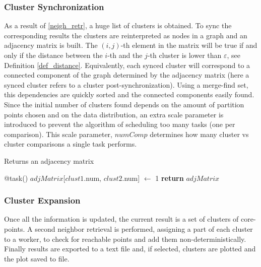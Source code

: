 \documentclass[10pt,journal,compsoc]{IEEEtran}
\let\MYoriglatexcaption\caption
\renewcommand{\caption}[2][\relax]{\MYoriglatexcaption[#2]{#2}}
\begin{document}
\subsubsection{Cluster Synchronization} \label{cluster_sync}
As a result of \ref{neigh_retr}, a huge list of clusters is obtained. To sync the corresponding results the clusters are reinterpreted as nodes in a graph and an adjacency matrix is built. The $(i,j)$-th element in the matrix will be true if and only if the distance between the $i$-th and the $j$-th cluster is lower than $\varepsilon$, see Definition \ref{def_distance}. Equivalently, each synced cluster will correspond to a connected component of the graph determined by the adjacency matrix (here a synced cluster refers to a cluster post-synchronization). Using a merge-find set, this dependencies are quickly sorted and the connected components easily found.
Since the initial number of clusters found depends on the amount of partition points chosen and on the data distribution, an extra scale parameter is introduced to prevent the algorithm of scheduling too many tasks (one per comparison). This scale parameter, $numComp$ determines how many cluster vs cluster comparisons a single task performs.

\begin{algorithm}
  \caption{Returns an adjacency matrix \label{alg:syncClusters}}
  \begin{algorithmic}[1]
            	\State @task()
            		\State $adjMatrix$[$clust1$.num, $clust2$.num] $\gets$ 1
                \EndIf
           	\EndFor
     	\EndFor
        \State \textbf{return} $adjMatrix$
    \EndFunction
  \end{algorithmic}
\end{algorithm}


\subsubsection{Cluster Expansion} \label{cluster_exp} 
Once all the information is updated, the current result is a set of clusters of core-points. A second neighbor retrieval is performed, assigning a part of each cluster to a worker, to check for reachable points and add them non-deterministically. Finally results are exported to a text file and, if selected, clusters are plotted and the plot saved to file.
\end{document}
